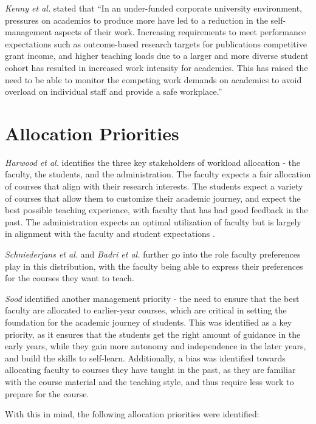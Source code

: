\textit{Kenny et al.} stated that ``In an under-funded corporate university environment, pressures on academics to produce more have led to a reduction in the self-management aspects of their work. Increasing requirements to meet performance expectations such as outcome-based research targets for publications competitive grant income, and higher teaching loads due to a larger and more diverse student cohort has resulted in increased work intensity for academics. This has raised the need to be able to monitor the competing work demands on academics to avoid overload on individual staff and provide a safe workplace.'' \cite{kenny2014effectiveness}

\section{Allocation Priorities}

\textit{Harwood et al.} identifies the three key stakeholders of workload allocation - the faculty, the students, and the administration. The faculty expects a fair allocation of courses that align with their research interests. The students expect a variety of courses that allow them to customize their academic journey, and expect the best possible teaching experience, with faculty that has had good feedback in the past. The administration expects an optimal utilization of faculty but is largely in alignment with the faculty and student expectations \cite{harwood1975optimizing}.

\textit{Schniederjans et al.} and \textit{Badri et al.} \cite{schniederjans1987goal, badri1998multi} further go into the role faculty preferences play in this distribution, with the faculty being able to express their preferences for the courses they want to teach.

\textit{Sood} \cite{rohan2017} identified another management priority - the need to ensure that the best faculty are allocated to earlier-year courses, which are critical in setting the foundation for the academic journey of students. This was identified as a key priority, as it ensures that the students get the right amount of guidance in the early years, while they gain more autonomy and independence in the later years, and build the skills to self-learn. Additionally, a bias was identified towards allocating faculty to courses they have taught in the past, as they are familiar with the course material and the teaching style, and thus require less work to prepare for the course.

With this in mind, the following allocation priorities were identified:

